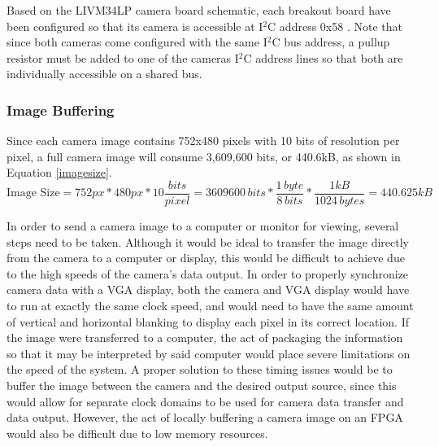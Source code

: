 Based on the LIVM34LP camera board schematic, each breakout board have been configured so that its camera is accessible at I$^2$C address 0x58 \cite{livm34lp,mt9v034}. Note that since both cameras come configured with the same I$^2$C bus address, a pullup resistor must be added to one of the cameras I$^2$C address lines so that both are individually accessible on a shared bus.

\subsubsection{Image Buffering}
Since each camera image contains 752x480 pixels with 10 bits of resolution per pixel, a full camera image will consume 3,609,600 bits, or 440.6kB, as shown in Equation \ref{imagesize}.
\begin{equation} \label{imagesize}
\textrm{Image Size} = 752px*480px*10\frac{bits}{pixel} = 3609600\,bits*\frac{1\,byte}{8\,bits}*\frac{1 kB}{1024\,bytes} = 440.625kB
\end{equation}
\par
In order to send a camera image to a computer or monitor for viewing, several steps need to be taken. Although it would be ideal to transfer the image directly from the camera to a computer or display, this would be difficult to achieve due to the high speeds of the camera's data output. In order to properly synchronize camera data with a VGA display, both the camera and VGA display would have to run at exactly the same clock speed, and would need to have the same amount of vertical and horizontal blanking to display each pixel in its correct location. If the image were transferred to a computer, the act of packaging the information so that it may be interpreted by said computer would place severe limitations on the speed of the system. A proper solution to these timing issues would be to buffer the image between the camera and the desired output source, since this would allow for separate clock domains to be used for camera data transfer and data output. However, the act of locally buffering a camera image on an FPGA would also be difficult due to low memory resources. 
\par
